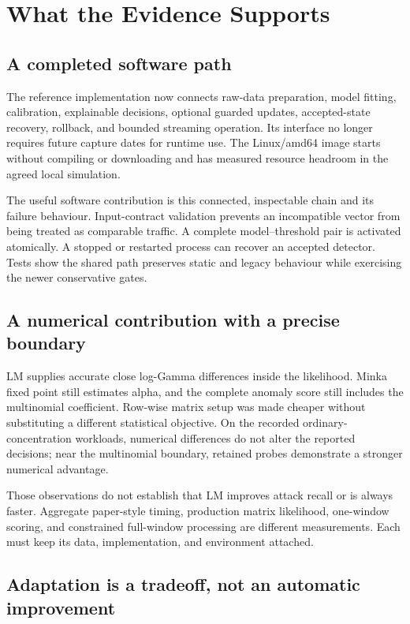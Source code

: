 \section{What the Evidence Supports}

\subsection{A completed software path}

The reference implementation now connects raw-data preparation, model fitting,
calibration, explainable decisions, optional guarded updates, accepted-state
recovery, rollback, and bounded streaming operation. Its interface no longer
requires future capture dates for runtime use. The Linux/amd64 image starts
without compiling or downloading and has measured resource headroom in the
agreed local simulation.

The useful software contribution is this connected, inspectable chain and its
failure behaviour. Input-contract validation prevents an incompatible vector
from being treated as comparable traffic. A complete model--threshold pair is
activated atomically. A stopped or restarted process can recover an accepted
detector. Tests show the shared path preserves static and legacy behaviour
while exercising the newer conservative gates.

\subsection{A numerical contribution with a precise boundary}

LM supplies accurate close log-Gamma differences inside the likelihood.
Minka fixed point still estimates alpha, and the complete anomaly score still
includes the multinomial coefficient. Row-wise matrix setup was made cheaper
without substituting a different statistical objective. On the recorded
ordinary-concentration workloads, numerical differences do not alter the
reported decisions; near the multinomial boundary, retained probes demonstrate
a stronger numerical advantage.

Those observations do not establish that LM improves attack recall or is always
faster. Aggregate paper-style timing, production matrix likelihood,
one-window scoring, and constrained full-window processing are different
measurements. Each must keep its data, implementation, and environment attached.

\subsection{Adaptation is a tradeoff, not an automatic improvement}

